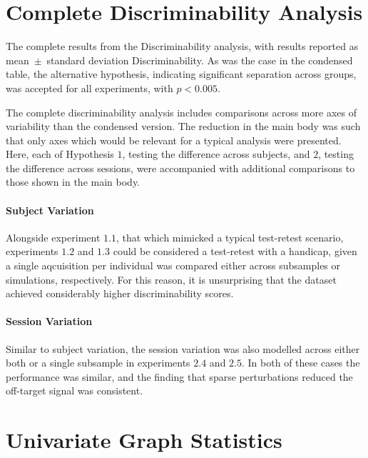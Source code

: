 \documentclass[fleqn,10pt]{SelfArx} %
\newcommand{\new}[1]{{\color{blue} #1}}
\begin{document}
\clearpage
\section{Complete Discriminability Analysis}
\label{supsec:discrimfull}

\begin{table}[ht]\centering
\caption{The complete results from the Discriminability analysis, with results reported as mean~$\pm$~standard
deviation Discriminability. As was the case in the condensed table, the alternative hypothesis, indicating significant
separation across groups, was accepted for all experiments, with $p < 0.005$.}
\vspace{5pt}

\label{stab:discrim_full}
\end{table}

The complete discriminability analysis includes comparisons across more axes of variability than the condensed version.
The reduction in the main body was such that only axes which would be relevant for a typical analysis were presented.
Here, each of Hypothesis $1$, testing the difference across subjects, and $2$, testing the difference across sessions,
were accompanied with additional comparisons to those shown in the main body.

\paragraph{Subject Variation}
Alongside experiment $1.1$, that which mimicked a typical test-retest scenario, experiments $1.2$ and $1.3$ could be
considered a test-retest with a handicap, given a single aqcuisition per individual was compared either across
subsamples or simulations, respectively. For this reason, it is unsurprising that the dataset achieved considerably
higher discriminability scores. 

\paragraph{Session Variation}
Similar to subject variation, the session variation was also modelled across either both or a single subsample \new{in
experiments $2.4$ and $2.5$}. In both of these cases the performance was similar, and the finding that \new{sparse}
perturbations reduced the off-target signal was consistent.

\clearpage
\section{Univariate Graph Statistics}
\label{supsec:univar}
\end{document}
